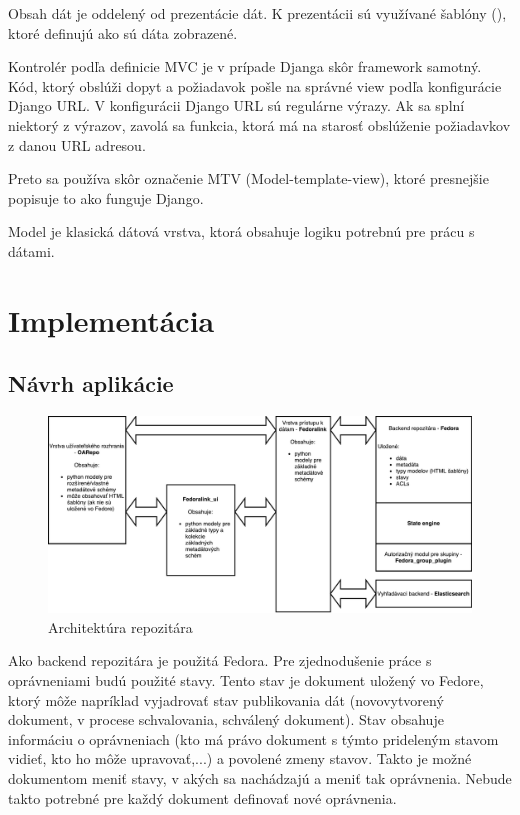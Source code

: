 \documentclass[thesis=M,slovak]{FITthesis}[2013/05/06]
\begin{document}
Obsah dát je oddelený od prezentácie dát. K prezentácii sú využívané šablóny (), ktoré definujú ako sú dáta zobrazené.

Kontrolér podľa definicie MVC je v prípade Djanga skôr framework samotný. Kód, ktorý obslúži dopyt a požiadavok pošle na správné view podľa konfigurácie Django URL. V konfigurácii Django URL sú regulárne výrazy. Ak sa splní niektorý z výrazov, zavolá sa funkcia, ktorá má na starosť obslúženie požiadavkov z danou URL adresou.

Preto sa používa skôr označenie MTV (Model-template-view), ktoré presnejšie popisuje to ako funguje Django. \cite{DjangoFAQ}

Model je klasická dátová vrstva, ktorá obsahuje logiku potrebnú pre prácu s dátami.

\chapter{Implementácia}
\section{Návrh aplikácie}
\begin{figure}\centering
	\includegraphics[width=1.0\textwidth]{diagramy/Architektura_repozitara.pdf}
 	\caption[Architektúra repozitára]{Architektúra repozitára}\label{graphics:architektura_repozitara}
\end{figure}


Ako backend repozitára je použitá Fedora. Pre zjednodušenie práce s oprávneniami budú použité stavy. Tento stav je dokument uložený vo Fedore, ktorý môže napríklad vyjadrovať stav publikovania dát (novovytvorený dokument, v procese schvalovania, schválený dokument). Stav obsahuje informáciu o oprávneniach (kto má právo dokument s týmto prideleným stavom vidieť, kto ho môže upravovať,...) a povolené zmeny stavov. Takto je možné dokumentom meniť stavy, v akých sa nachádzajú a meniť tak oprávnenia. Nebude takto potrebné pre každý dokument definovať nové oprávnenia.
\end{document}
